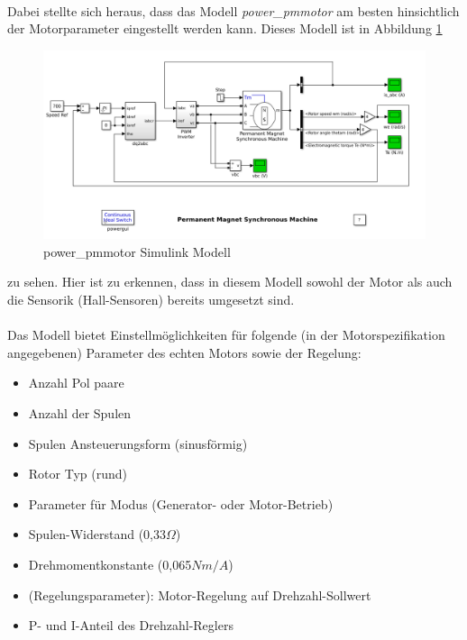 \paragraph{}
Dabei stellte sich heraus, dass das Modell \textit{power\_pmmotor} am besten hinsichtlich der Motorparameter eingestellt werden kann. 
Dieses Modell ist in Abbildung \ref{FigPowerPmmotor}
\begin{figure}[htbp]
	\centering
	\includegraphics[width=\textwidth]{./sim/pictures/powerPmmotor.png}
	\caption{power\_pmmotor Simulink Modell}
	\label{FigPowerPmmotor}
\end{figure}

zu sehen. Hier ist zu erkennen, dass in diesem Modell sowohl der Motor als auch die Sensorik (Hall-Sensoren) bereits umgesetzt sind. 

\paragraph{}
Das Modell bietet Einstellmöglichkeiten für folgende (in der Motorspezifikation angegebenen) Parameter des echten Motors sowie der Regelung:
\begin{itemize}
	\item Anzahl Pol paare
	\item Anzahl der Spulen
	\item Spulen Ansteuerungsform (sinusförmig)
	\item Rotor Typ (rund)
	\item Parameter für Modus (Generator- oder Motor-Betrieb)
	\item Spulen-Widerstand (0,33$\Omega$) 
	\item Drehmomentkonstante (0,065$Nm/A$)
	\item (Regelungsparameter): Motor-Regelung auf Drehzahl-Sollwert 
	\item P- und I-Anteil des Drehzahl-Reglers
\end{itemize}

